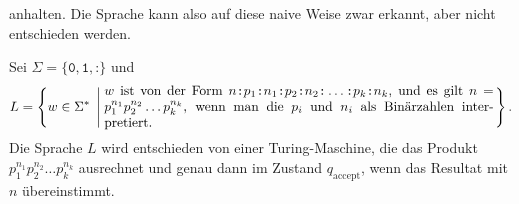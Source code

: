 \begin{loesung}
\begin{teilaufgaben}
anhalten. Die Sprache kann also auf diese naive Weise zwar erkannt, aber
nicht entschieden werden.
\item 
Sei $\Sigma=\{\texttt{0},\texttt{1},\texttt{:}\}$ und 
\[
L=\left\{ w\in\Sigma^*\;\left|\;
\begin{minipage}{4truein}
$w$ ist von der Form
$n\texttt{:}p_1\texttt{:}n_1\texttt{:}p_2\texttt{:}n_2\texttt{:}\dots\texttt{:}p_k\texttt{:}n_k$, und es gilt $n=p_1^{n_1}p_2^{n_2}\dots p_k^{n_k}$,
wenn man die $p_i$ und $n_i$ als Binärzahlen interpretiert.
\end{minipage}
\right.\right\}.
\]
Die Sprache $L$ wird entschieden von einer Turing-Maschine, die das Produkt
$p_1^{n_1}p_2^{n_2}\dots p_k^{n_k}$ ausrechnet und genau dann im Zustand
$q_{\text{accept}}$, wenn das Resultat mit $n$ übereinstimmt.
\qedhere
\end{teilaufgaben}
\end{loesung}

